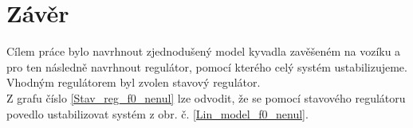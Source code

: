 \documentclass[a4paper, 12pt]{article}
\begin{document}
	\section{Závěr}
		Cílem práce bylo navrhnout zjednodušený model kyvadla zavěšeném na vozíku a pro ten následně navrhnout regulátor, pomocí kterého celý systém ustabilizujeme. Vhodným regulátorem byl zvolen stavový regulátor.\\
		Z grafu číslo \ref{Stav_reg_f0_nenul} lze odvodit, že se pomocí stavového regulátoru povedlo ustabilizovat systém z obr. č. \ref{Lin_model_f0_nenul}.
\end{document}
